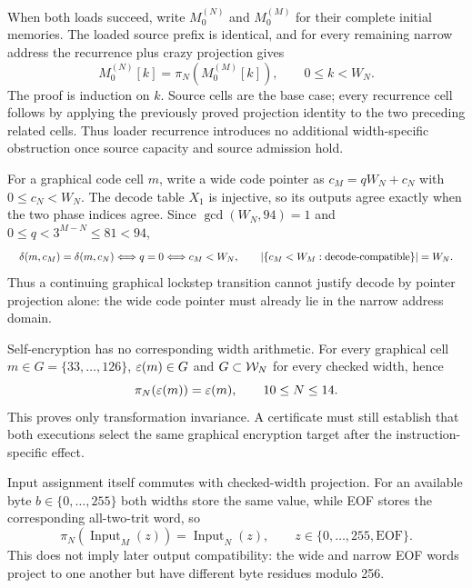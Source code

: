 \documentclass{article}
\newcommand{\fitmath}[1]{\resizebox{0.99\linewidth}{!}{$\displaystyle #1$}}
\begin{document}
When both loads succeed, write $M_0^{(N)}$ and $M_0^{(M)}$ for their complete
initial memories. The loaded source prefix is identical, and for every
remaining narrow address the recurrence plus crazy projection gives
\begin{equation}
  M_0^{(N)}[k]=\pi_N\!\left(M_0^{(M)}[k]\right),
  \qquad 0\leq k<W_N.
  \label{eq:optimization-profile-width-initial-memory-projection}
\end{equation}
The proof is induction on $k$. Source cells are the base case; every recurrence
cell follows by applying the previously proved projection identity to the two
preceding related cells. Thus loader recurrence introduces no additional
width-specific obstruction once source capacity and source admission hold.

For a graphical code cell $m$, write a wide code pointer as
$c_M=qW_N+c_N$ with $0\leq c_N<W_N$. The decode table $X_1$ is injective, so
its outputs agree exactly when the two phase indices agree. Since
$\gcd(W_N,94)=1$ and $0\leq q<3^{M-N}\leq81<94$,
\begin{equation}
  \fitmath{%
    \DecodeOp(m,c_M)=\DecodeOp(m,c_N)
    \Longleftrightarrow q=0
    \Longleftrightarrow c_M<W_N,
    \qquad
    \left|\{c_M<W_M:\text{decode-compatible}\}\right|=W_N.
  }
  \label{eq:optimization-profile-width-decode-compatible-count}
\end{equation}
Thus a continuing graphical lockstep transition cannot justify decode by
pointer projection alone: the wide code pointer must already lie in the narrow
address domain.

Self-encryption has no corresponding width arithmetic. For every graphical cell
$m\in G=\{33,\ldots,126\}$, $\varepsilon(m)\in G$ and $G\subset\mathcal{W}_{N}$
for every checked width, hence
\begin{equation}
  \pi_N\!\left(\varepsilon(m)\right)=\varepsilon(m),
  \qquad 10\leq N\leq14.
  \label{eq:optimization-profile-width-encryption-invariance}
\end{equation}
This proves only transformation invariance. A certificate must still establish
that both executions select the same graphical encryption target after the
instruction-specific effect.

Input assignment itself commutes with checked-width projection. For an available
byte $b\in\{0,\ldots,255\}$ both widths store the same value, while EOF stores
the corresponding all-two-trit word, so
\begin{equation}
  \pi_N\!\left(\operatorname{Input}_M(z)\right)
    = \operatorname{Input}_N(z),
  \qquad
  z\in\{0,\ldots,255,\mathrm{EOF}\}.
  \label{eq:optimization-profile-width-input-projection}
\end{equation}
This does not imply later output compatibility: the wide and narrow EOF words
project to one another but have different byte residues modulo 256.
\end{document}
